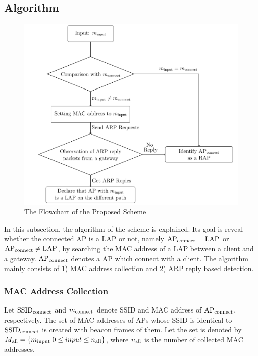 \documentclass[conference]{IEEEtran}
\newcommand{\SSID}{\rm SSID_{connect}}
\newcommand{\tarAP}{\rm AP_{connect}}
\newcommand{\tarMAC}{m_{\rm connect}}
\begin{document}
\subsection{Algorithm} \label{sec:alg}
\begin{figure}[t]
    \begin{center}
        \includegraphics[scale=0.42]{flowchart/flowchart.pdf}
        \caption{The Flowchart of the Proposed Scheme}
        \label{fig:flowchart}
    \end{center}
\vspace{-2zh}
\end{figure}
In this subsection, the algorithm of the scheme is explained.
Its goal is reveal whether the connected AP is a LAP or not, namely $\tarAP = LAP$ or $\tarAP \ne LAP$, by searching the MAC address of a LAP between a client and a gateway.
$\tarAP$ denotes a AP which connect with a client.
The algorithm mainly consists of 1) MAC address collection and 2) ARP reply based detection.

\subsubsection{MAC Address Collection}
Let $\SSID$ and $\tarMAC$ denote SSID and MAC address of $\tarAP$, respectively.
The set of MAC addresses of APs whose SSID is identical to $\SSID$  is created with beacon frames of them.
Let the set is denoted by $M_{\rm all}=\{m_{\rm i nput}|0\le input \le n_{\rm al l}  \}$, where $n_{\rm all}$ is the number of collected MAC addresses.
\end{document}
